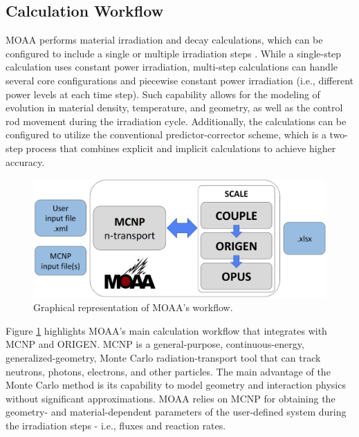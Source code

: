 \subsection{Calculation Workflow}

MOAA performs material irradiation and decay calculations, which can be configured to include a single or multiple irradiation steps \cite{fairhurst_development_2022}.
While a single-step calculation uses constant power irradiation, multi-step calculations can handle several core configurations and piecewise constant power irradiation (i.e., different power levels at each time step).
Such capability allows for the modeling of evolution in material density, temperature, and geometry, as well as the control rod movement during the irradiation cycle.
Additionally, the calculations can be configured to utilize the conventional predictor-corrector scheme, which is a two-step process that combines explicit and implicit calculations to achieve higher accuracy.

\begin{figure}[htbp!]
  \begin{center}
    \includegraphics[scale=0.4]{figures/diagram_2}
  \end{center}
  \caption{Graphical representation of MOAA's workflow.}
  \label{fig:workflow_1}
\end{figure}

Figure \ref{fig:workflow_1} highlights MOAA's main calculation workflow that integrates with MCNP and ORIGEN.
MCNP is a general-purpose, continuous-energy, generalized-geometry, Monte Carlo radiation-transport tool that can track neutrons, photons, electrons, and other particles.
The main advantage of the Monte Carlo method is its capability to model geometry and interaction physics without significant approximations.
MOAA relies on MCNP for obtaining the geometry- and material-dependent parameters of the user-defined system during the irradiation steps - i.e., fluxes and reaction rates.

